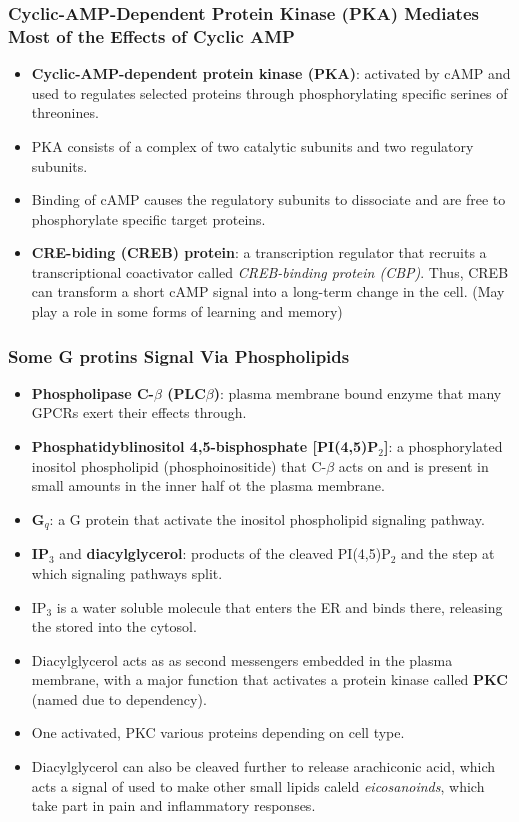 \documentclass[12pt,a4paper]{article}
\begin{document}
\subsubsection{Cyclic-AMP-Dependent Protein Kinase (PKA) Mediates Most of the Effects of Cyclic AMP}
\begin{itemize}
    \item \textbf{Cyclic-AMP-dependent protein kinase (PKA)}: activated by cAMP and used to regulates selected proteins through phosphorylating specific serines of threonines.
    \item PKA consists of a complex of two catalytic subunits and two regulatory subunits.
    \item Binding of cAMP causes the regulatory subunits to dissociate and are free to phosphorylate specific target proteins.
    \item \textbf{CRE-biding (CREB) protein}: a transcription regulator that recruits a transcriptional coactivator called \textit{CREB-binding protein (CBP)}. Thus, CREB can transform a short cAMP signal into a long-term change in the cell. (May play a role in some forms of learning and memory)
\end{itemize}

\subsubsection{Some G protins Signal Via Phospholipids}
\begin{itemize}
    \item \textbf{Phospholipase C-$\beta$ (PLC$\beta$)}: plasma membrane bound enzyme that many GPCRs exert their effects through.
    \item \textbf{Phosphatidyblinositol 4,5-bisphosphate [PI(4,5)P$_2$]}: a phosphorylated inositol phospholipid (phosphoinositide) that C-$\beta$ acts on and is present in small amounts in the inner half ot the plasma membrane.
    \item \textbf{G$_q$}: a G protein that activate the inositol phospholipid signaling pathway.
    \item \textbf{IP$_3$} and \textbf{diacylglycerol}: products of the cleaved PI(4,5)P$_2$ and the step at which signaling pathways split.
    \item IP$_3$ is a water soluble molecule that enters the ER and binds there, releasing the stored  into the cytosol.
    \item Diacylglycerol acts as as second messengers embedded in the plasma membrane, with a major function that activates a protein kinase called \textbf{PKC} (named due to  dependency).
    \item One activated, PKC various proteins depending on cell type.
    \item Diacylglycerol can also be cleaved further to release arachiconic acid, which acts a signal of used to make other small lipids caleld \textit{eicosanoinds}, which take part in pain and inflammatory responses.
\end{itemize}
\end{document}
